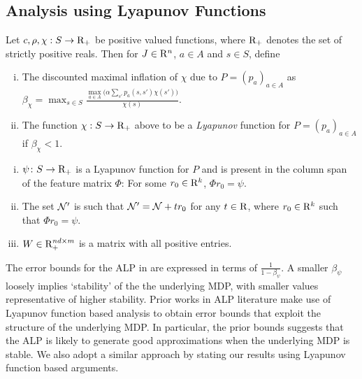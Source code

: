 \subsection{Analysis using Lyapunov Functions}
\begin{definition}\label{def:lyap}
Let $c,\rho,\chi:S \to \mathrm{R}_+$ be positive valued functions, where $\mathrm{R}_+$ denotes the set of strictly positive reals. Then for $J\in \mathrm{R}^n$, $a\in A$ and $s\in S$, define
\begin{enumerate}[(i)]
\item The discounted maximal inflation of $\chi$ due to $P = (p_a)_{a\in A}$ as $\beta_{\chi}=\max_{s \in S} \frac{\underset{a \in A}{\max}\big(\alpha\sum_{s'}p_a(s,s')\chi(s')\big)}{\chi(s)}$.
\item The function $\chi:S\to\mathrm{R}_+$ above to be a \emph{Lyapunov} function for $P = (p_a)_{a\in A}$ if $\beta_{\chi}<1$.
\end{enumerate}
\end{definition}
\begin{assumption}\label{grlpassmp}
\begin{enumerate}[(i)]
\item \label{lyap} $\psi\colon S \rightarrow \mathrm{R}_+$ is a Lyapunov function for $P$
and is present in the column span of the feature matrix $\Phi$: For some $r_0\in \mathrm{R}^k$, $\Phi r_0 = \psi$.
\item \label{ass:n4} The set $\mathcal{N}'$ is such that $\mathcal{N}' = \mathcal{N} + t r_0$ for any $t\in \mathrm{R}$, where $r_0\in \mathrm{R}^k$ such that $\Phi r_0 = \psi$.
\item \label{wassmp} $W \in \mathrm{R}^{nd\times m}_+$ is a matrix with all positive entries.
\end{enumerate}
\end{assumption}
The error bounds for the ALP in \cite{ALP} are expressed in terms of $\frac{1}{1-\beta_{\psi}}$.  A smaller $\beta_{\psi}$ loosely implies `stability' of the the underlying MDP,  with smaller values representative of higher stability. Prior works in ALP literature \cite{ALP,SALP,CS} make use of Lyapunov function based analysis to obtain error bounds that exploit the structure of the underlying MDP. In particular, the prior bounds suggests that the ALP is likely to generate good approximations when the underlying MDP is stable. We also adopt a similar approach by stating our results using Lyapunov function based arguments.

